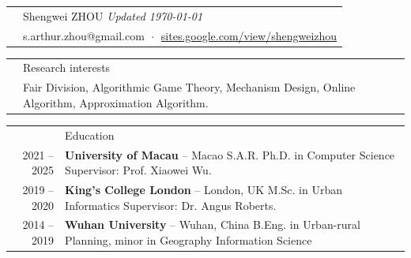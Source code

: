 \documentclass[letterpaper, 11pt]{article}
\newcommand{\headingfont}{\Large\color{OliveGreen}}
\newenvironment{SectionTable}[1]{
	\renewcommand*{\arraystretch}{1.2}
	\setlength{\tabcolsep}{8pt}
	\begin{longtable}{Rp{6.2in}} & #1 \\}
{\end{longtable}\vspace{-.7cm}}
\newenvironment{SectionTableSingleSpace}[1]{
	\renewcommand*{\arraystretch}{1.2}
	\setlength{\tabcolsep}{8pt}
	\begin{longtable}{Rp{6.2in}} & #1 \\[0.6em]}
{\end{longtable}\vspace{-.7cm}}
\begin{document}

\begin{SectionTable}{\Huge Shengwei ZHOU \hfill{\it\footnotesize Updated \today}} & 
\faEnvelope \; s.arthur.zhou@gmail.com   $\;\boldsymbol{\cdot}\;$ 
\faGlobe \; \href{https://sites.google.com/view/shengweizhou}{sites.google.com/view/shengweizhou} \newline
\end{SectionTable}


\begin{SectionTableSingleSpace}{\headingfont Research interests}
& Fair Division, Algorithmic Game Theory, Mechanism Design, Online Algorithm, \newline
Approximation Algorithm.
\end{SectionTableSingleSpace}


\begin{SectionTable}{\headingfont Education}
2021 -- 2025 & 
\textbf{University of Macau} -- Macao S.A.R. \newline
Ph.D. in Computer Science \newline 
Supervisor: Prof. Xiaowei Wu. \\

2019 -- 2020 & 
\textbf{King's College London} -- London, UK \newline
M.Sc. in Urban Informatics \newline 
Supervisor: Dr. Angus Roberts. \\

2014 -- 2019 & 
\textbf{Wuhan University} -- Wuhan, China \newline
B.Eng. in Urban-rural Planning, minor in Geography Information Science \\



\end{SectionTable}
\end{document}
